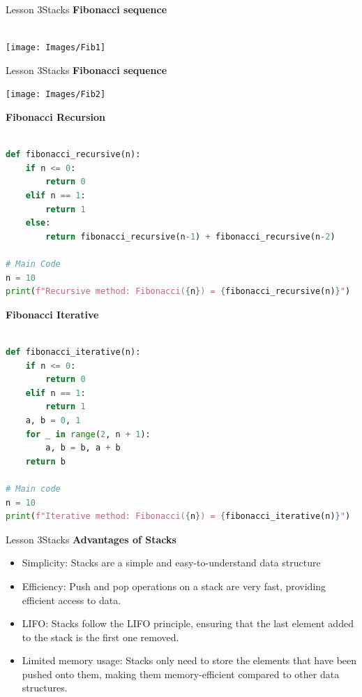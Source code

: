 \documentclass[aspectratio=1610]{beamer}
\begin{document}
\begin{frame}{Lesson 3}{Stacks}
\LARGE
\textbf{Fibonacci sequence}\\~\\
\begin{center}
\texttt{[image: Images/Fib1]}
\end{center}
\end{frame}


\begin{frame}{Lesson 3}{Stacks}
\LARGE
\textbf{Fibonacci sequence}
\begin{center}
\texttt{[image: Images/Fib2]}
\end{center}
\end{frame}


\begin{frame}[fragile]
\Large
\textbf{Fibonacci Recursion}\\~\\
\begin{lstlisting}[language=Python]
def fibonacci_recursive(n):
    if n <= 0:
        return 0
    elif n == 1:
        return 1
    else:
        return fibonacci_recursive(n-1) + fibonacci_recursive(n-2)

# Main Code
n = 10
print(f"Recursive method: Fibonacci({n}) = {fibonacci_recursive(n)}")
 \end{lstlisting}
\end{frame} 



\begin{frame}[fragile]
\Large
\textbf{Fibonacci Iterative}\\~\\
\begin{lstlisting}[language=Python]
def fibonacci_iterative(n):
    if n <= 0:
        return 0
    elif n == 1:
        return 1
    a, b = 0, 1
    for _ in range(2, n + 1):
        a, b = b, a + b
    return b

# Main code
n = 10
print(f"Iterative method: Fibonacci({n}) = {fibonacci_iterative(n)}")
 \end{lstlisting}
\end{frame} 



\begin{frame}{Lesson 3}{Stacks}
\LARGE
\textbf{Advantages of Stacks}\\
\Large
\begin{itemize}
\item Simplicity: Stacks are a simple and easy-to-understand data structure
\item Efficiency: Push and pop operations on a stack are very fast, providing efficient access to data.
\item LIFO: Stacks follow the LIFO principle, ensuring that the last element added to the stack is the first one removed.
\item Limited memory usage: Stacks only need to store the elements that have been pushed onto them, making them memory-efficient compared to other data structures.
\end{itemize}
\end{frame}
\end{document}
